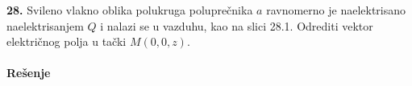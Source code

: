 \textbf{\Large 28.} Svileno vlakno oblika polukruga polupre\v{c}nika $a$ ravnomerno je naelektrisano naelektrisanjem $Q$ i nalazi se u vazduhu, kao na slici 28.1. Odrediti vektor elektri\v{c}nog polja u ta\v{c}ki $M(0,0,z)$.
\\\\
\textbf{\Large Re\v{s}enje}\\
